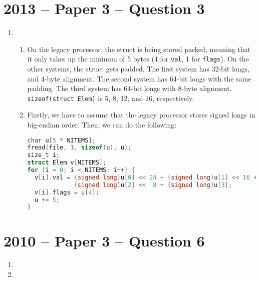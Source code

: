 \documentclass{article}
\begin{document}
\section{2013 -- Paper 3 -- Question 3}
\begin{enumerate}
  \item
    \begin{enumerate}
      \item On the legacy processor, the struct is being stored packed, meaning that it only takes up the mininum of 5 bytes (4 for \texttt{val}, 1 for \texttt{flags}). On the other systems, the struct gets padded. The first system has 32-bit longs, and 4-byte alignment. The second system has 64-bit longs with the same padding. The third system has 64-bit longs with 8-byte alignment. \texttt{sizeof(struct Elem)} is 5, 8, 12, and 16, respectively.
      \item Firstly, we have to assume that the legacy processor stores signed longs in big-endian order. Then, we can do the following:
        \begin{lstlisting}[language=C]
char u[5 * NITEMS];
fread(file, 1, sizeof(u), u);
size_t i;
struct Elem v[NITEMS];
for (i = 0; i < NITEMS; i++) {
  v[i].val = (signed long)u[0] << 24 + (signed long)u[1] << 16 +
             (signed long)u[2] <<  8 + (signed long)u[3];
  v[i].flags = u[4];
  u += 5;
}
        \end{lstlisting}
    \end{enumerate}
\end{enumerate}

\section{2010 -- Paper 3 -- Question 6}
\begin{enumerate}
  \item 
  \item
\end{enumerate}
\end{document}
